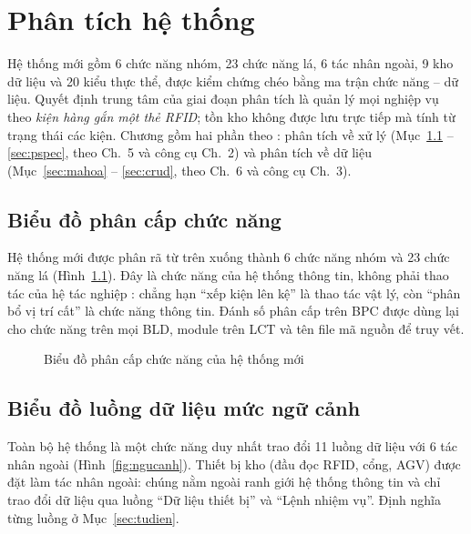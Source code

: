 \chapter{Phân tích hệ thống}
\label{ch:phantich}

Hệ thống mới gồm 6 chức năng nhóm, 23 chức năng lá, 6 tác nhân ngoài, 9 kho dữ liệu và 20 kiểu thực thể, được kiểm chứng chéo bằng ma trận chức năng -- dữ liệu. Quyết định trung tâm của giai đoạn phân tích là quản lý mọi nghiệp vụ theo \emph{kiện hàng gắn một thẻ RFID}; tồn kho không được lưu trực tiếp mà tính từ trạng thái các kiện. Chương gồm hai phần theo \cite{tung_qlhttt}: phân tích về xử lý (Mục~\ref{sec:bpc} -- \ref{sec:pspec}, theo Ch.~5 và công cụ Ch.~2) và phân tích về dữ liệu (Mục~\ref{sec:mahoa} -- \ref{sec:crud}, theo Ch.~6 và công cụ Ch.~3).

\section{Biểu đồ phân cấp chức năng}
\label{sec:bpc}

Hệ thống mới được phân rã từ trên xuống thành 6 chức năng nhóm và 23 chức năng lá (Hình~\ref{fig:bpc}). Đây là chức năng của hệ thống thông tin, không phải thao tác của hệ tác nghiệp \cite[Ch.~5]{tung_qlhttt}: chẳng hạn “xếp kiện lên kệ” là thao tác vật lý, còn “phân bổ vị trí cất” là chức năng thông tin. Đánh số phân cấp trên BPC được dùng lại cho chức năng trên mọi BLD, module trên LCT và tên file mã nguồn để truy vết.

\begin{figure}[H]
\centering
{}
\caption{Biểu đồ phân cấp chức năng của hệ thống mới}
\label{fig:bpc}
\end{figure}

\section{Biểu đồ luồng dữ liệu mức ngữ cảnh}
\label{sec:ngucanh}

Toàn bộ hệ thống là một chức năng duy nhất trao đổi 11 luồng dữ liệu với 6 tác nhân ngoài (Hình~\ref{fig:ngucanh}). Thiết bị kho (đầu đọc RFID, cổng, AGV) được đặt làm tác nhân ngoài: chúng nằm ngoài ranh giới hệ thống thông tin và chỉ trao đổi dữ liệu qua luồng “Dữ liệu thiết bị” và “Lệnh nhiệm vụ”. Định nghĩa từng luồng ở Mục~\ref{sec:tudien}.

